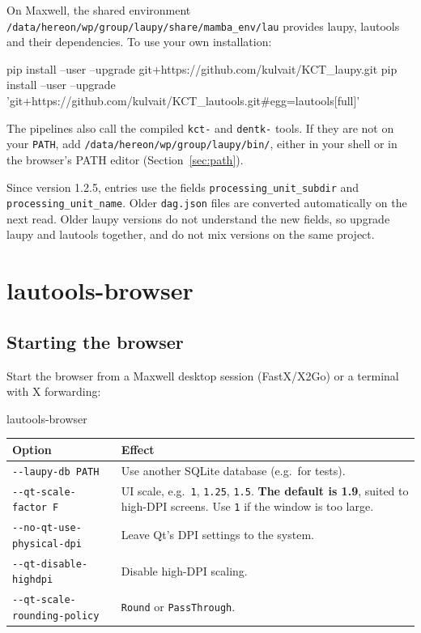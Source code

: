 \documentclass[11pt,a4paper]{article}
\newcommand{\cmd}[1]{\texttt{#1}}
\begin{document}
On Maxwell, the shared environment \cmd{/data/hereon/wp/group/laupy/share/mamba\_env/lau}
provides laupy, lautools and their dependencies. To use your own installation:

\begin{terminal}
pip install --user --upgrade git+https://github.com/kulvait/KCT_laupy.git
pip install --user --upgrade 'git+https://github.com/kulvait/KCT_lautools.git#egg=lautools[full]'
\end{terminal}

The pipelines also call the compiled \cmd{kct-} and \cmd{dentk-} tools. If they are not on your
\cmd{PATH}, add \cmd{/data/hereon/wp/group/laupy/bin/}, either in your shell or in the browser's
PATH editor (Section~\ref{sec:path}).

\begin{warning}[Upgrading]
Since version 1.2.5, entries use the fields \cmd{processing\_unit\_subdir} and
\cmd{processing\_unit\_name}. Older \cmd{dag.json} files are converted automatically on the next
read. Older laupy versions do not understand the new fields, so upgrade laupy and lautools
together, and do not mix versions on the same project.
\end{warning}

\section{lautools-browser}

\subsection{Starting the browser}

Start the browser from a Maxwell desktop session (FastX/X2Go) or a terminal with X forwarding:

\begin{terminal}
lautools-browser
\end{terminal}

\begin{center}
\begin{tabularx}{\linewidth}{@{}l>{\raggedright\arraybackslash}X@{}}
\toprule
Option & Effect \\
\midrule
\cmd{-{}-laupy-db PATH} & Use another SQLite database (e.g.\ for tests). \\
\cmd{-{}-qt-scale-factor F} & UI scale, e.g.\ \cmd{1}, \cmd{1.25}, \cmd{1.5}. \textbf{The default is 1.9}, suited to high-DPI screens. Use \cmd{1} if the window is too large. \\
\cmd{-{}-no-qt-use-physical-dpi} & Leave Qt's DPI settings to the system. \\
\cmd{-{}-qt-disable-highdpi} & Disable high-DPI scaling. \\
\cmd{-{}-qt-scale-rounding-policy} & \cmd{Round} or \cmd{PassThrough}. \\
\bottomrule
\end{tabularx}
\end{center}
\end{document}
